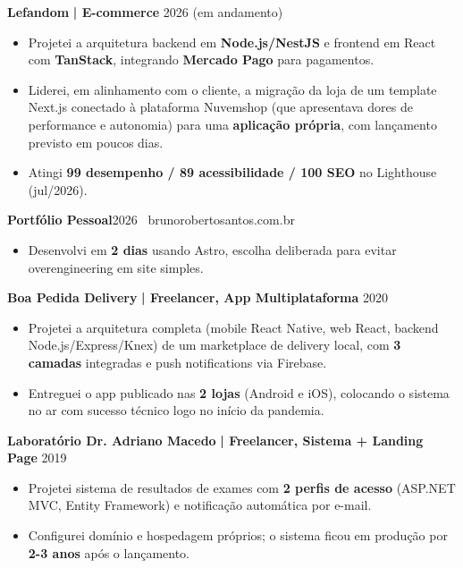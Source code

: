 \documentclass[a4paper]{article}
\begin{document}
    \textbf{Lefandom}\textbf{ | E-commerce} \hfill  2026 (em andamento)\\
    \vspace{-3mm}
    \begin{itemize} \itemsep -3pt
        \item Projetei a arquitetura backend em \textbf{Node.js/NestJS} e frontend em React com \textbf{TanStack}, integrando \textbf{Mercado Pago} para pagamentos.
        \item Liderei, em alinhamento com o cliente, a migra\c{c}\~ao da loja de um template Next.js conectado \`a plataforma Nuvemshop (que apresentava dores de performance e autonomia) para uma \textbf{aplica\c{c}\~ao pr\'opria}, com lan\c{c}amento previsto em poucos dias.
        \item Atingi \textbf{99 desempenho / 89 acessibilidade / 100 SEO} no Lighthouse (jul/2026).
    \end{itemize}

    \textbf{Portf\'olio Pessoal}\hfill  2026 \textbullet\ brunorobertosantos.com.br\\
    \vspace{-3mm}
    \begin{itemize} \itemsep -3pt
        \item Desenvolvi em \textbf{2 dias} usando Astro, escolha deliberada para evitar overengineering em site simples.
    \end{itemize}

    \textbf{Boa Pedida Delivery}\textbf{ | Freelancer, App Multiplataforma} \hfill  2020\\
    \vspace{-3mm}
    \begin{itemize} \itemsep -3pt
        \item Projetei a arquitetura completa (mobile React Native, web React, backend Node.js/Express/Knex) de um marketplace de delivery local, com \textbf{3 camadas} integradas e push notifications via Firebase.
        \item Entreguei o app publicado nas \textbf{2 lojas} (Android e iOS), colocando o sistema no ar com sucesso t\'ecnico logo no in\'icio da pandemia.
    \end{itemize}

    \textbf{Laborat\'orio Dr. Adriano Macedo}\textbf{ | Freelancer, Sistema + Landing Page} \hfill  2019\\
    \vspace{-3mm}
    \begin{itemize} \itemsep -3pt
        \item Projetei sistema de resultados de exames com \textbf{2 perfis de acesso} (ASP.NET MVC, Entity Framework) e notifica\c{c}\~ao autom\'atica por e-mail.
        \item Configurei dom\'inio e hospedagem pr\'oprios; o sistema ficou em produ\c{c}\~ao por \textbf{2-3 anos} ap\'os o lan\c{c}amento.
    \end{itemize}
\end{document}
